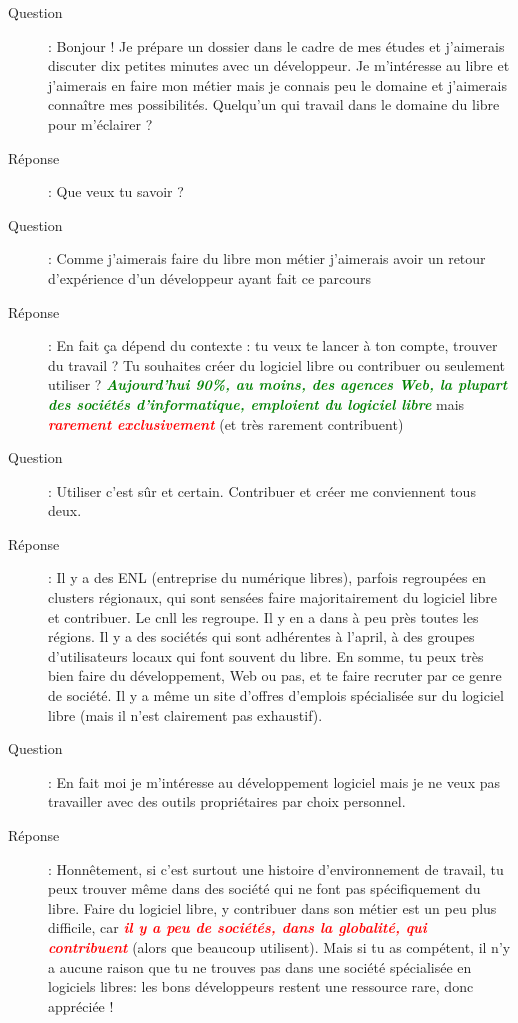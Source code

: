\documentclass[a4paper,12pt, draft]{report}
\newcommand{\goodPoint}[1]{\textcolor{green}{\textbf{\textit{#1}}}}
\newcommand{\badPoint}[1]{\textcolor{red}{\textbf{\textit{#1}}}}
\begin{document}
\begin{description}
\item [Question]:  Bonjour ! Je prépare un dossier dans le cadre de mes études et j'aimerais discuter dix petites minutes avec un développeur. Je m'intéresse au libre et j'aimerais en faire mon métier mais je connais peu le domaine et j'aimerais connaître mes possibilités. Quelqu'un qui travail dans le domaine du libre pour m'éclairer ?
\item [Réponse]:  Que veux tu savoir ?
\item [Question]:  Comme j'aimerais faire du libre mon métier j'aimerais avoir un retour d'expérience d'un développeur ayant fait ce parcours
\item [Réponse]:  En fait ça dépend du contexte : tu veux te lancer à ton compte, trouver du travail ? Tu souhaites créer du logiciel libre ou contribuer ou seulement utiliser ? \goodPoint{Aujourd'hui 90\%, au moins, des agences Web, la plupart des sociétés d'informatique, emploient du logiciel libre} mais \badPoint{rarement exclusivement} (et très rarement contribuent)
\item [Question]:  Utiliser c'est sûr et certain. Contribuer et créer me conviennent tous deux.
\item [Réponse]:  Il y a des ENL (entreprise du numérique libres), parfois regroupées en clusters régionaux, qui sont sensées faire majoritairement du logiciel libre et contribuer. Le cnll\cite{cnll} les regroupe. Il y en a dans à peu près toutes les régions. Il y a des sociétés qui sont adhérentes à l'april, à des groupes d'utilisateurs locaux qui font souvent du libre. En somme, tu peux très bien faire du développement, Web ou pas, et te faire recruter par ce genre de société. Il y a même un site\cite{lolix} d'offres d'emplois spécialisée sur du logiciel libre (mais il n'est clairement pas exhaustif).
\item [Question]:  En fait moi je m'intéresse au développement logiciel mais je ne veux pas travailler avec des outils propriétaires par choix personnel.
\item [Réponse]:  Honnêtement, si c'est surtout une histoire d'environnement de travail, tu peux trouver même dans des société qui ne font pas spécifiquement du libre. Faire du logiciel libre, y contribuer dans son métier est un peu plus difficile, car \badPoint{il y a peu de sociétés, dans la globalité, qui contribuent} (alors que beaucoup utilisent). Mais si tu as compétent, il n'y a aucune raison que tu ne trouves pas dans une société spécialisée en logiciels libres: les bons développeurs restent une ressource rare, donc appréciée !

\end{description}
\end{document}
